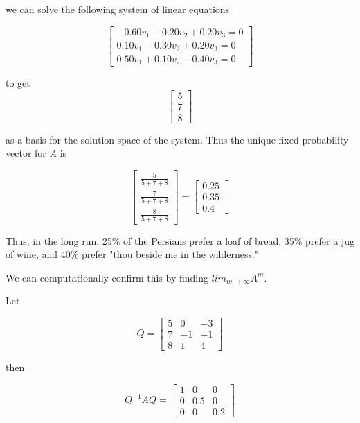 \documentclass{amsart}
\theoremstyle{definition}
\theoremstyle{remark}
\numberwithin{equation}{section}
\begin{document}
we can solve the following system of linear equations

\begin{equation}
    \begin{bmatrix}
           -0.60v_1 + 0.20v_2 + 0.20v_3  = 0 \\
           0.10v_1 - 0.30v_2 + 0.20v_3 = 0\\
           0.50v_1 + 0.10v_2 - 0.40v_3 = 0
         \end{bmatrix}
\end{equation}

 to get 
\begin{equation}
    \begin{bmatrix}
           5 \\
           7 \\
           8


         \end{bmatrix}
\end{equation}

as a basis for the solution space of the system.
Thus the unique fixed probability vector for $A$ is 

\[  \begin{bmatrix}
\frac{5}{5 + 7 + 8} \\
\frac{7}{5 + 7 + 8}\\
\frac{8}{5 + 7 + 8}
\end{bmatrix} 
%
=
\begin{bmatrix}{}
0.25 \\
0.35 \\
0.4
\end{bmatrix} 
\]

Thus, in the long run. 25\% of the Persians prefer a loaf of bread, 35\% prefer a jug of wine, and 40\% prefer "thou beside me in the wilderness."

We can computationally confirm this by finding $lim_{m \to \infty}A^m$.

Let 

\begin{equation}
    Q = \begin{bmatrix}
           5 & 0 & -3  \\
           7 & -1 & -1 \\
           8 & 1 & 4
         \end{bmatrix}
\end{equation}


then

\begin{equation}
    Q^{-1}AQ = \begin{bmatrix}
           1 & 0 & 0  \\
           0 & 0.5 & 0 \\
           0 & 0 & 0.2
         \end{bmatrix}
\end{equation}
\end{document}
